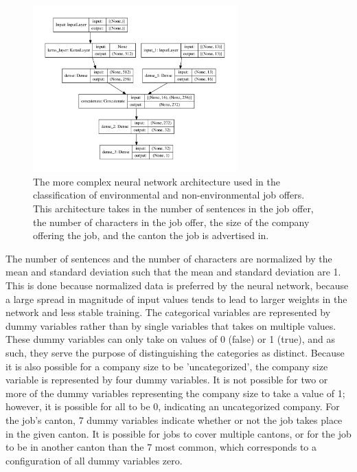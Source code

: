 \begin{figure}[htbp]
  \centering
    \includegraphics[width=0.7\textwidth]{figures/NeuralNetArch_AllInputs.pdf}
    \caption[The more complex neural network architecture used in the classification of environmental and non-environmental job offers]{
    	The more complex neural network architecture used in the classification of environmental and non-environmental job offers. This architecture takes in the number of sentences in the job offer, the number of characters in the job offer, the size of the company offering the job, and the canton the job is advertised in.
    	}
\label{fig:fullnetwork}
\end{figure}

The number of sentences and the number of characters are normalized by the mean and standard deviation such that the mean and standard deviation are 1. This is done because normalized data is preferred by the neural network, because a large spread in magnitude of input values tends to lead to larger weights in the network and less stable training. The categorical variables are represented by dummy variables rather than by single variables that takes on multiple values. These dummy variables can only take on values of 0 (false) or 1 (true), and as such, they serve the purpose of distinguishing the categories as distinct. Because it is also possible for a company size to be 'uncategorized', the company size variable is represented by four dummy variables. It is not possible for two or more of the dummy variables representing the company size to take a value of 1; however, it is possible for all to be 0, indicating an uncategorized company. For the job's canton, 7 dummy variables indicate whether or not the job takes place in the given canton. It is possible for jobs to cover multiple cantons, or for the job to be in another canton than the 7 most common, which corresponds to a configuration of all dummy variables zero.


